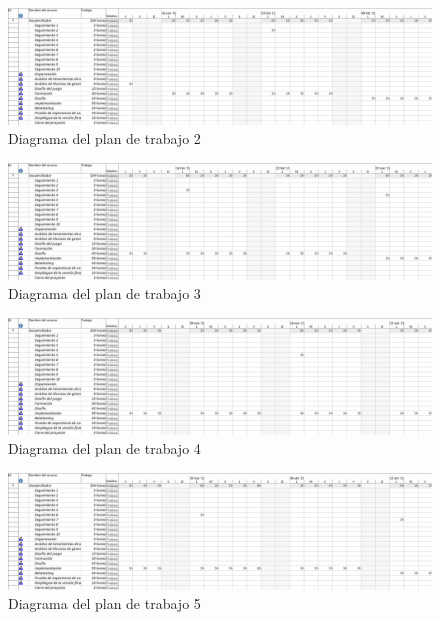 			\begin{figure}[!htp]
				\centering
				\includegraphics[page=2, scale=.45, angle=90]{fig/Plan2}
				\caption{Diagrama del plan de trabajo 2}
			\end{figure}

			\begin{figure}[!htp]
				\centering
				\includegraphics[page=3, scale=.45, angle=90]{fig/Plan3}
				\caption{Diagrama del plan de trabajo 3}
			\end{figure}

			\begin{figure}[!htp]
				\centering
				\includegraphics[page=4, scale=.45, angle=90]{fig/Plan4}
				\caption{Diagrama del plan de trabajo 4}
			\end{figure}

			\begin{figure}[!htp]
				\centering
				\includegraphics[page=5, scale=.45, angle=90]{fig/Plan5}
				\caption{Diagrama del plan de trabajo 5}
			\end{figure}

